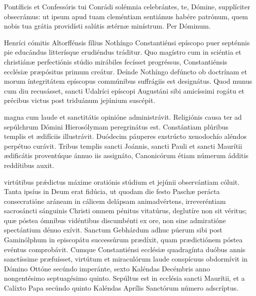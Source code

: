 \documentclass[fontsize=9pt,paper=A6,twoside,BCOR=1mm,DIV=22,headinclude]{scrarticle}
\begin{document}
\begin{multicols}{2}


\VRCPi

\MiCP

 Pontíficis et Confessóris tui Conrádi solémnia celebrántes, te, Dómine, supplíciter obsecrámus: ut ipsum apud tuam cleméntiam sentiámus habére patrónum, quem nobis tua grátia providísti salútis ætérnæ minístrum. Per Dóminum.


 Henríci cómitis Altorffénsis fílius Nothíngo Constantiénsi epíscopo puer septénnis pie educándus litterísque erudiéndus tráditur. Quo magístro cum in sciéntia et christiánæ perfectiónis stúdio mirábiles fecísset progréssus, Constantiénsis ecclésiæ præpósitus primum creátur. Deínde Nothíngo defúncto ob doctrínam et morum íntegritátem epíscopus commúnibus suffrágiis est designátus. Quod munus cum diu recusásset, sancti Udalríci epíscopi Augustáni sibi amicíssimi rogátu et précibus victus post triduánum jejúnium suscépit.

\RVCPiv

{
 magna cum laude et sanctitátis opinióne administrávit. Religiónis causa ter ad sepúlchrum Dómini Hierosólymam peregrinátus est. Constántiam plúribus templis et ædifíciis illustrávit. Duódecim páuperes exstrúcto xenodochío aléndos perpétuo curávit. Tribus templis sancti Joánnis, sancti Pauli et sancti Maurítii ædificátis proventúque ánnuo iis assignáto, Canonicórum étiam númerum ádditis reddítibus auxit.

\RVCPv 

 virtútibus pr\'ædictus máxime oratiónis stúdium et jejúnii observántiam cóluit. Tanta ipsíus in Deum erat fidúcia, ut quodam die festo Paschæ perácta consecratióne aráneam in cálicem delápsam animadvértens, irreveréntiam sacrosáncti sánguinis Christi omnem pénitus vitatúrus, deglutíre non sit véritus; quæ póstea ómnibus vidéntibus discumbénti ex ore, non sine admiratióne spectántium dénuo exívit. Sanctum Gebhárdum adhuc púerum sibi post Gaminólphum in episcopátu successúrum prædíxit, quam prædictiónem póstea evéntus comprobávit. Cumque Constantiénsi ecclésiæ quadragínta duóbus annis sanctíssime præfuísset, virtútum et miraculórum laude conspícuus obdormívit in Dómino Ottóne secúndo imperánte, sexto Kaléndas Decémbris anno nongentésimo septuagésimo quinto. Sepúltus est in ecclésia sancti Maurítii, et a Calíxto Papa secúndo quinto Kaléndas Aprílis Sanctórum número adscríptus.

}
\end{multicols}
\end{document}
